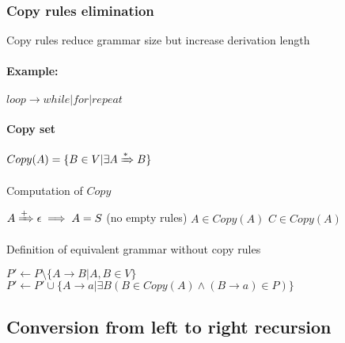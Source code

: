 \documentclass{article}
\newcommand{\derives}[1][ ]{\xRightarrow{#1}}
\begin{document}
\subsubsection{Copy rules elimination} Copy rules reduce grammar size but increase derivation length
\paragraph{Example: }$loop \to while | for | repeat$
\paragraph{Copy set} $Copy(A)=\{B \in V | \exists A \derives[*]B\}$
\begin{algorithm}
\caption{Computation of $Copy$}
\begin{algorithmic}
\REQUIRE $A \derives[+] \epsilon \implies A=S$ (no empty rules)
\REPEAT
		\STATE $A \in Copy(A)$
				\STATE $C \in Copy(A)$
			\ENDIF
		\ENDFOR
	\ENDFOR
{}
\end{algorithmic}
\end{algorithm}
\begin{algorithm}
\caption{Definition of equivalent grammar without copy rules}
\begin{algorithmic}
\STATE $P' \leftarrow P \setminus \{A\to B|A,B \in V\}$ 
\STATE $P' \leftarrow P' \cup \{A\to a|\exists B(B \in Copy(A) \wedge (B\to a)\in P)\}$ 
\end{algorithmic}
\end{algorithm}
\subsection{Conversion from left to right recursion}
\end{document}
